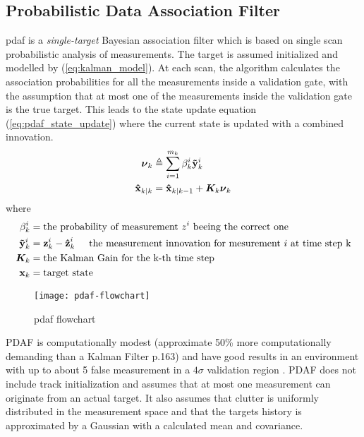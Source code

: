 \subsection{Probabilistic Data Association Filter}
\label{pdaf}
\gls{pdaf} is a \emph{single-target} Bayesian association filter which is based on single scan probabilistic analysis of \glspl{measurement}. The \gls{target} is assumed initialized and modelled by (\ref{eq:kalman_model}). At each scan, the algorithm calculates the association probabilities for all the \glspl{measurement} inside a validation gate, with the assumption that at most one of the \glspl{measurement} inside the validation gate is the true \gls{target}. This leads to the state update equation (\ref{eq:pdaf_state_update}) where the current state is updated with a combined innovation.
\begin{equation}
\begin{split}
\boldsymbol{\mathbf{\nu}}_k &\triangleq \sum\limits_{i=1}^{m_k} \beta_k^i \boldsymbol{\mathbf{\tilde{y}}}_k^i \\
\boldsymbol{\mathbf{\hat{x}}}_{k|k} &= \boldsymbol{\mathbf{\hat{x}}}_{k|k-1} + \bm{K}_k \boldsymbol{\mathbf{\nu}}_k
\end{split}
\label{eq:pdaf_state_update}
\end{equation} 
where
\begin{equation*}
\begin{split}
	\beta_k^i	&= \text{the probability of measurement $z^i$ beeing the correct one} \\
	\boldsymbol{\mathbf{\tilde{y}}}_k^i &= \boldsymbol{\mathbf{z}}_k^i - \boldsymbol{\mathbf{\hat{z}}}_k^i \hspace{5mm}	\text{the measurement innovation for mesurement $i$ at time step k} \\
	\bm{K}_k 	&= \text{the Kalman Gain for the k-th time step} \\
	\boldsymbol{\mathbf{x}}_k 	&= \text{target state}
\end{split}
\end{equation*}
\begin{wrapfigure}[20]{R}{0.5\textwidth}
\centering
\texttt{[image: pdaf-flowchart]}
\caption{\gls{pdaf} flowchart \cite{Bar-Shalom1998}}
\label{fig:pdaf_flowchart}
\end{wrapfigure}
PDAF is computationally modest (approximate 50\% more computationally demanding than a Kalman Filter \cite{Bar-Shalom1998} p.163) and have good results in an environment with up to about 5 false \gls{measurement} in a $4\sigma$ validation region \cite{Bar-Shalom1998}. PDAF does not include track initialization and assumes that at most one \gls{measurement} can originate from an actual \gls{target}. It also assumes that clutter is uniformly distributed in the \gls{measurement} space and that the \glspl{target} history is approximated by a Gaussian with a calculated mean and covariance.

